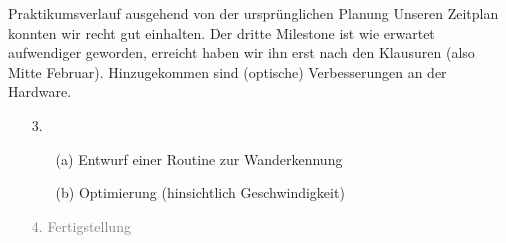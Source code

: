 \documentclass{beamer}
\begin{document}
\begin{frame}[fragile,t]{Praktikumsverlauf ausgehend von der ursprünglichen Planung}
Unseren Zeitplan konnten wir recht gut einhalten. Der dritte Milestone ist wie erwartet aufwendiger geworden, erreicht haben wir ihn erst nach den Klausuren (also Mitte Februar). Hinzugekommen sind (optische) Verbesserungen an der Hardware. 

\smallskip
\begin{enumerate}
 \item[3.] 
 \begin{enumerate}
 \item[(a)] Entwurf einer Routine zur Wanderkennung
 \item[(b)] Optimierung (hinsichtlich Geschwindigkeit)
 \end{enumerate}
 \item[\textcolor{gray}{4.}] \textcolor{gray}{Fertigstellung}
\end{enumerate}
\end{frame}
\end{document}
